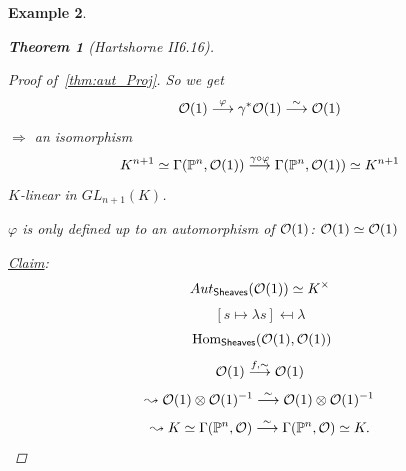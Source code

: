 \documentclass[11pt]{article}
\newtheorem{thm}{Theorem}[section]
\newtheorem{ex}[thm]{Example}
\renewcommand{\hom}{\text{ Hom}}
\newcommand{\proj}{\mathbb P}
\newcommand{\calo}{{\cal O}}
\newcommand{\Lrta}{\Longrightarrow}
\newcommand{\lrta}{\longrightarrow}
\begin{document}
\begin{ex}
\begin{enumerate}[label=\boxed{\arabic*}]
\begin{thm}[Hartshorne II6.16]
\begin{proof}[Proof of~\ref{thm:aut_Proj}]
So we get 
$$
\calo(1)\overset{\varphi}{\lrta}\gamma^*\calo(1)\overset{\sim}{\lrta}\calo(1)
$$
$\Lrta$ an isomorphism
$$
K^{n+1}\simeq\Gamma(\proj^n,\calo(1))\overset{\gamma\circ \varphi}{\lrta}\Gamma(\proj^n,\calo(1))\simeq K^{n+1}
$$
$K$-linear in $GL_{n+1}(K)$. 

$\varphi$ is only defined up to an automorphism of $\calo(1)$:
$\calo(1)\simeq\calo(1)$

\underline{Claim}: 
$$
Aut_{\mathsf{Sheaves}}(\calo(1))\simeq K^{\times}
$$
$$
[s\mapsto \lambda s]\mapsfrom \lambda
$$
$$
\hom_{\mathsf{Sheaves}}(\calo(1),\calo(1))
$$
$$
\calo(1)\overset{f,\sim}{\lrta}\calo(1)
$$
$$
\leadsto \calo(1)\otimes\calo(1)^{-1}\overset{\sim}{\lrta}\calo(1)\otimes\calo(1)
^{-1}
$$
$$
\leadsto
K\simeq \Gamma(\proj^n,\calo)\overset{\sim}{\lrta}\Gamma(\proj^n,\calo)\simeq K.
$$
\end{proof}

\end{thm}
\end{enumerate}
\end{ex}
\end{document}
